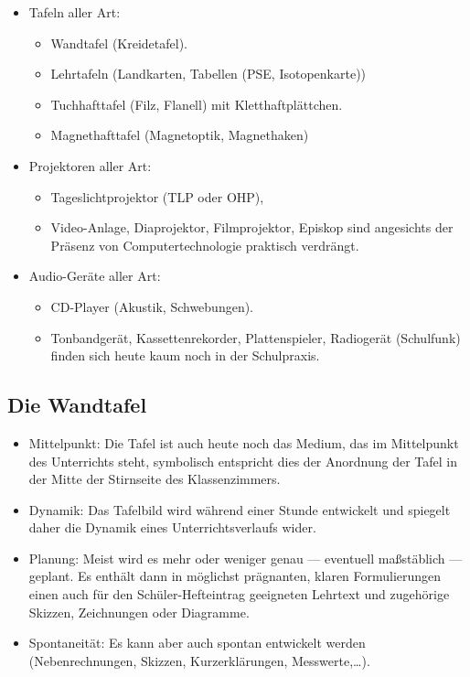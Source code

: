 \begin{itemize}
\item
Tafeln aller Art:
\begin{itemize}
\item
Wandtafel (Kreidetafel).
\item
Lehrtafeln (Landkarten, Tabellen (PSE, Isotopen\-karte))
\item
Tuch\-hafttafel (Filz, Flanell) mit Kletthaftpl\"{a}ttchen.
\item
Magnet\-haft\-ta\-fel (Magnet\-optik, Magnet\-haken)
\end{itemize}

\item
Projektoren aller Art:
\begin{itemize}
\item
Tageslichtprojektor (TLP oder OHP),
\item
Video-Anlage, Diaprojektor, Filmprojektor, Episkop sind angesichts der Pr\"{a}senz von Computertechnologie praktisch verdr\"{a}ngt. \end{itemize}
\item
Audio-Ger\"{a}te aller Art:
\begin{itemize}
\item
CD-Player (Akustik, Schwebungen).
\item
Tonbandger\"{a}t, Kassettenrekorder, Plattenspieler, Radioger\"{a}t (Schulfunk) finden sich heute kaum noch in der Schulpraxis.
\end{itemize}
\end{itemize}


\subsection{Die Wandtafel}
\begin{itemize}
\item Mittelpunkt: Die Tafel ist auch heute noch das Medium, das im
Mittelpunkt des Unterrichts steht,
symbolisch entspricht dies der Anordnung der Tafel in
der Mitte der Stirnseite des Klassenzimmers.

\item Dynamik: Das Tafelbild wird w\"{a}hrend einer Stunde entwickelt
und spiegelt daher die Dynamik eines Unterrichts\-verlaufs wider.

\item Planung: Meist wird es mehr oder weniger genau --- eventuell
ma{\ss}st\"{a}blich --- geplant.
Es enth\"{a}lt dann in m\"{o}glichst pr\"{a}gnanten, klaren Formulierungen einen
auch f\"{u}r den Sch\"{u}ler-Hefteintrag geeigneten Lehrtext
und zugeh\"{o}rige Skizzen, Zeichnungen oder Diagramme.

\item Spontaneit\"{a}t: Es kann aber auch spontan entwickelt werden
(Nebenrechnungen, Skizzen, Kurzerkl\"{a}rungen, Messwerte,\dots).
\end{itemize}

